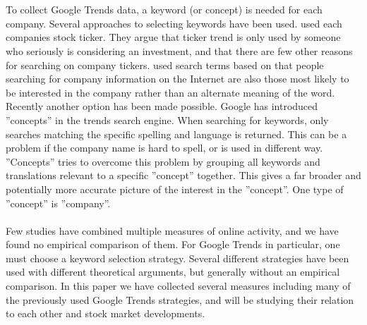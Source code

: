 \\\\
To collect Google Trends data, a keyword (or concept) is needed for each company.  Several approaches to selecting keywords have been used. \cite{joseph} used each companies stock ticker. They argue that ticker trend is only used by someone who seriously is considering an investment, and that there are few other reasons for searching on company tickers. \cite{bijl} used search terms based on that people searching for company information on the Internet are also those most likely to be interested in the company rather than an alternate meaning of the word. Recently another option has been made possible. Google has introduced ''concepts'' in the trends search engine. When searching for keywords, only searches matching the specific spelling and language is returned. This can be a problem if the company name is hard to spell, or is used in different way. ”Concepts” tries to overcome this problem by grouping all keywords and translations relevant to a specific ”concept” together. This gives a far broader and potentially more accurate picture of the interest in the ”concept”. One type of ”concept” is ”company”. 
\\\\
Few studies have combined multiple measures of online activity, and we have found no empirical comparison of them. For Google Trends in particular, one must choose a keyword selection strategy. Several different strategies have been used with different theoretical arguments, but generally without an empirical comparison. In this paper we have collected several measures including many of the previously used Google Trends strategies, and will be studying their relation to each other and stock market developments. 


\cleardoublepage